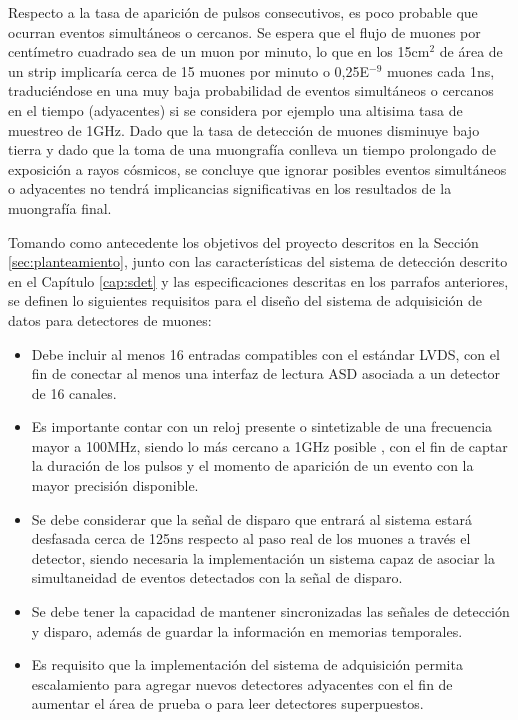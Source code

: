 	Respecto a la tasa de aparición de pulsos consecutivos, es poco probable que ocurran eventos simultáneos o cercanos. Se espera que el flujo de muones por centímetro cuadrado sea de un muon por minuto\cite{Rocca2018CosmicUs}, lo que en los 15cm$^2$ de área de un strip implicaría cerca de 15 muones por minuto o 0,25E$^{-9}$ muones cada 1ns, traduciéndose en una muy baja probabilidad de eventos simultáneos o cercanos en el tiempo (adyacentes) si se considera por ejemplo una altisima tasa de muestreo de 1GHz. Dado que la tasa de detección de muones disminuye bajo tierra y dado que la toma de una muongrafía conlleva un tiempo prolongado de exposición a rayos cósmicos, se concluye que ignorar posibles eventos simultáneos o adyacentes no tendrá implicancias significativas en los resultados de la muongrafía final. 
	
	Tomando como antecedente los objetivos del proyecto descritos en la Sección \ref{sec:planteamiento}, junto con las características del sistema de detección descrito en el Capítulo \ref{cap:sdet} y las especificaciones descritas en los parrafos anteriores, se definen lo siguientes requisitos para el diseño del sistema de adquisición de datos para detectores de muones:
	
	\begin{itemize}
		\item Debe incluir al menos 16 entradas compatibles con el estándar LVDS, con el fin de conectar al menos una interfaz de lectura ASD asociada a un detector de 16 canales.
		\item Es importante contar con un reloj presente o sintetizable de una frecuencia mayor a 100MHz, siendo lo más cercano a 1GHz posible , con el fin de captar la duración de los pulsos y el momento de aparición de un evento con la mayor precisión disponible.
		\item Se debe considerar que la señal de disparo que entrará al sistema estará desfasada cerca de 125ns\cite{Oyanadel2020SistemaSTGC} respecto al paso real de los muones a través el detector, siendo necesaria la implementación un sistema capaz de asociar la simultaneidad de eventos detectados con la señal de disparo.
		\item  Se debe tener la capacidad de mantener sincronizadas las señales de detección y disparo, además de guardar la información en memorias temporales.
		\item Es requisito que la implementación del sistema de adquisición permita escalamiento para agregar nuevos detectores adyacentes con el fin de aumentar el área de prueba o para leer detectores superpuestos.
	\end{itemize}
	
